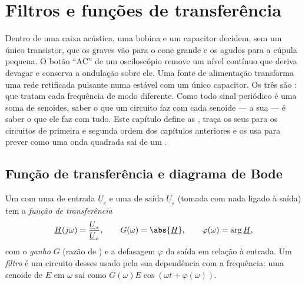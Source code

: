 \chapter{Filtros e funções de transferência}\label{ch:b1:filters-transfer-functions}

Dentro de uma caixa acústica, uma bobina e um capacitor decidem, sem um
único transistor, que os graves vão para o cone grande e os agudos para
a cúpula pequena. O botão ``AC'' de um osciloscópio remove um nível contínuo que
deriva devagar e conserva a ondulação sobre ele. Uma fonte de alimentação transforma
uma rede retificada pulsante numa  estável com um único capacitor.
Os três são \emph{}:  que tratam cada frequência
de modo diferente. Como todo sinal periódico é uma soma de senoides, saber
o que um circuito faz com cada senoide --- a sua  --- é
saber o que ele faz com tudo. Este capítulo define as , traça os seus  para os circuitos de primeira e
segunda ordem dos capítulos anteriores e os usa para prever como uma
onda quadrada sai de um .

\section{Função de transferência e diagrama de Bode}

\begin{definition}\label{def:b1:filters-transfer-functions:H}
Um  com uma  de entrada $\underline U_e$ e uma 
de saída $\underline U_s$ (tomada com nada ligado à saída) tem
a \emph{função de transferência}
\[
\underline H(j\omega) = \frac{\underline U_s}{\underline U_e},
\qquad G(\omega) = \abs{\underline H}, \qquad \varphi(\omega) = \arg\underline H,
\]
com o \emph{ganho} $G$ (razão de ) e a defasagem $\varphi$
da saída em relação à entrada. Um \emph{filtro} é um circuito desses
usado pela sua dependência com a frequência: uma senoide de  $E$ em
$\omega$ sai como $G(\omega)E\cos(\omega t + \varphi(\omega))$.
\end{definition}

